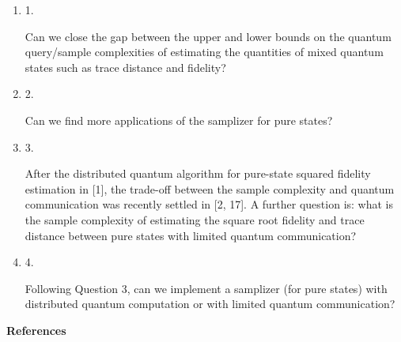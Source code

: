 \documentclass[10pt,a4paper]{article}
\begin{document}
\begin{enumerate}


\item[] 
1. 


Can we close the gap between the upper and lower bounds on the quantum query/sample complexities of estimating the quantities of mixed quantum states such as trace distance and fidelity?\par





\item[] 
2. 


Can we find more applications of the samplizer for pure states?\par





\item[] 
3. 


After the distributed quantum algorithm for pure-state squared fidelity estimation in [1], the trade-off between the sample complexity and quantum communication was recently settled in [2, 17].
A further question is: what is the sample complexity of estimating the square root fidelity and trace distance between pure states with limited quantum communication?\par





\item[] 
4. 


Following Question 3, can we implement a samplizer (for pure states) with distributed quantum computation or with limited quantum communication?\par





\end{enumerate}





\par\medskip\noindent\textbf{References}\par
\end{document}
